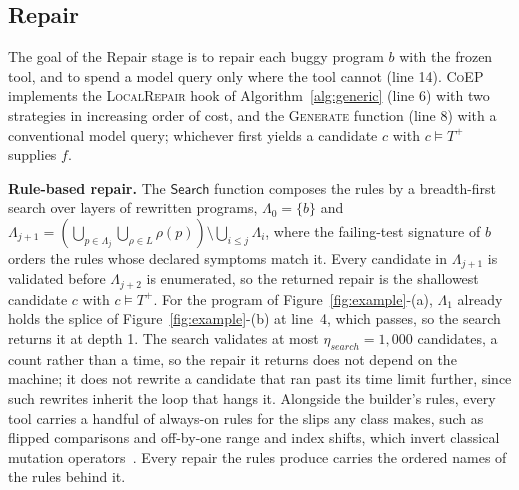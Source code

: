 \documentclass[acmsmall,screen,review,anonymous,nonacm]{acmart}
\newcommand{\tool}{\textsc{CoEP}\xspace}
\newcommand{\Fn}[1]{\textsc{#1}}
\newcommand{\aux}[1]{\ensuremath{\mathsf{#1}}}
\newcommand{\V}[1]{\ensuremath{\mathit{#1}}}
\begin{document}
\subsection{Repair}
\label{sec:repair}

The goal of the Repair stage is to repair each buggy program $b$ with the frozen tool, and to spend a model query only where the tool cannot (line 14). \tool implements the \Fn{LocalRepair} hook of Algorithm~\ref{alg:generic} (line 6) with two strategies in increasing order of cost, and the \Fn{Generate} function (line 8) with a conventional model query; whichever first yields a candidate $c$ with $c \models T^{+}$ supplies $f$.

\textbf{Rule-based repair.} The \aux{Search} function composes the rules by a breadth-first search over layers of rewritten programs, $\Lambda_0 = \{b\}$ and $\Lambda_{j+1} = (\bigcup_{p \in \Lambda_j} \bigcup_{\rho \in L} \rho(p)) \setminus \bigcup_{i \le j} \Lambda_i$, where the failing-test signature of $b$ orders the rules whose declared symptoms match it. Every candidate in $\Lambda_{j+1}$ is validated before $\Lambda_{j+2}$ is enumerated, so the returned repair is the shallowest candidate $c$ with $c \models T^{+}$. For the program of Figure~\ref{fig:example}-(a), $\Lambda_1$ already holds the splice of Figure~\ref{fig:example}-(b) at line~4, which passes, so the search returns it at depth 1. The search validates at most $\eta_{\V{search}} = 1{,}000$ candidates, a count rather than a time, so the repair it returns does not depend on the machine; it does not rewrite a candidate that ran past its time limit further, since such rewrites inherit the loop that hangs it. Alongside the builder's rules, every tool carries a handful of always-on rules for the slips any class makes, such as flipped comparisons and off-by-one range and index shifts, which invert classical mutation operators~\cite{just2014mutants,kim2013automatic,liu2019tbar}. Every repair the rules produce carries the ordered names of the rules behind it.
\end{document}
